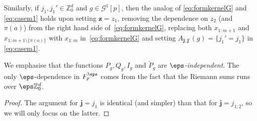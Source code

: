 \documentclass[reqno,11pt]{preprint}
\renewcommand{\Z}{\mathbb{Z}}
\newcommand{\bj}{\mathbf{j}}
\newcommand{\bz}{\mathbf{z}}
\newcommand{\cG}{\mathcal{G}}
\newcommand{\1}{\mathds{1}}
\begin{document}
\begin{lemma}
Similarly, if $j_1,j_1'\in \Z^d_0$ and  $g\in \cG^1[p]$, 
then the analog of \eqref{eq:formkernelG} and \ref{eq:casem1} holds upon
setting $\bz=z_1$, removing the dependence on $z_2$ (and $\pi(a)$) 
from the right hand side of~\eqref{eq:formkernelG}, replacing both $x_{1:m+1}$ and $x_{1:m+1\setminus\{\pi(a)\}}$ with $x_{1:m}$ in~\eqref{eq:formkernelG} and setting $A_{\bj; \bj'}(g)=\{j_1'=j_1\}$ in \eqref{eq:casem1}.
\end{lemma}

We emphasise that the functions $P_g, Q_g, I_g$ and $\tilde P_g$ are {\it $\eps$-independent}. 
The only $\eps$-dependence in $F^\eps_p$ comes from the fact that the Riemann sums runs over $\eps \Z^d_0$. 

\begin{proof}
The argument for $\bj=j_1$ is identical (and simpler) than that for $\bj=j_{1:2}$, so we will 
only focus on the latter. 


\end{proof}
\end{document}
